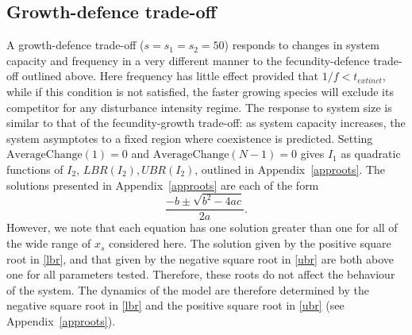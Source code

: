 \subsection{Growth-defence trade-off}
A growth-defence trade-off ($s=s_1=s_2=50$) responds to changes in system capacity and frequency in a very different manner to the fecundity-defence trade-off outlined above. Here frequency has little effect provided that $1/f<t_{extinct}$, while if this condition is not satisfied, the faster growing species will exclude its competitor for any disturbance intensity regime. The response to system size is similar to that of the fecundity-growth trade-off: as system capacity increases, the system asymptotes to a fixed region where coexistence is predicted. Setting $\text{AverageChange}(1)=0$ and $\text{AverageChange}(N-1)=0$ gives $I_1$ as quadratic functions of $I_2$, $LBR(I_2), UBR(I_2)$, outlined in Appendix~\ref{approots}.
The solutions presented in Appendix~\ref{approots} are each of the form
$$
\frac{-b\pm \sqrt{b^2-4ac}}{2a}.
$$ 
However, we note that each equation has one solution greater than one for all of the wide range of $x_s$ considered here. The solution given by the positive square root in \eqref{lbr}, and that given by the negative square root in \eqref{ubr} are both above one for all parameters tested. Therefore, these roots do not affect the behaviour of the system. The dynamics of the model are therefore determined by the negative square root in \eqref{lbr} and the positive square root in \eqref{ubr} (see Appendix~\ref{approots}).
